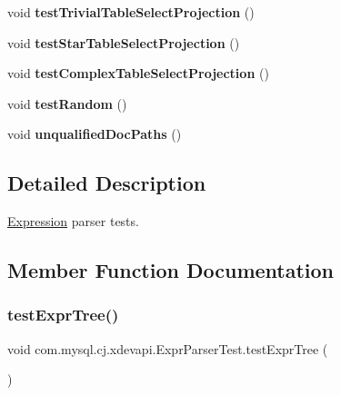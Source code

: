 \begin{DoxyCompactItemize}
void {\bfseries test\+Trivial\+Table\+Select\+Projection} ()
\item 
\mbox{\label{classcom_1_1mysql_1_1cj_1_1xdevapi_1_1_expr_parser_test_ab76eea997a560f5c68a0c8883bed75fd}} 
void {\bfseries test\+Star\+Table\+Select\+Projection} ()
\item 
\mbox{\label{classcom_1_1mysql_1_1cj_1_1xdevapi_1_1_expr_parser_test_a5d93bf44220315720c64464b25b52ee3}} 
void {\bfseries test\+Complex\+Table\+Select\+Projection} ()
\item 
\mbox{\label{classcom_1_1mysql_1_1cj_1_1xdevapi_1_1_expr_parser_test_afb1345adcc0f20d3397fb8d20caed9f4}} 
void {\bfseries test\+Random} ()
\item 
\mbox{\label{classcom_1_1mysql_1_1cj_1_1xdevapi_1_1_expr_parser_test_a33f5dc42b756d3d21ca8e418fa76d14a}} 
void {\bfseries unqualified\+Doc\+Paths} ()
\end{DoxyCompactItemize}


\subsection{Detailed Description}
\mbox{\hyperlink{classcom_1_1mysql_1_1cj_1_1xdevapi_1_1_expression}{Expression}} parser tests. 

\subsection{Member Function Documentation}
\mbox{\label{classcom_1_1mysql_1_1cj_1_1xdevapi_1_1_expr_parser_test_a7e69cddec256b6dc69fb737e56161272}} 
\subsubsection{\texorpdfstring{test\+Expr\+Tree()}{testExprTree()}}
{\footnotesize\ttfamily void com.\+mysql.\+cj.\+xdevapi.\+Expr\+Parser\+Test.\+test\+Expr\+Tree (\begin{DoxyParamCaption}{ }\end{DoxyParamCaption})}

